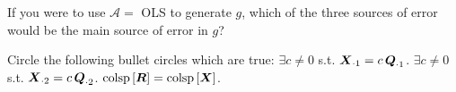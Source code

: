 \documentclass[12pt]{article}
\begin{document}
 If you were to use $\mathcal{A} =$ OLS to generate $g$, which of the three sources of error would be the main source of error in $g$? 


Circle the following bullet circles which are true:
 $\exists c \neq 0$ s.t. $\boldsymbol{X}_{\cdot 1} = c\,\boldsymbol{Q}_{\cdot 1}$. 
 $\exists c \neq 0$ s.t. $\boldsymbol{X}_{\cdot 2} = c\,\boldsymbol{Q}_{\cdot 2}$. 
 $\text{colsp}\left[\boldsymbol{R}\right] =\text{colsp}\left[\boldsymbol{X}\right]$.  
\eenum
\end{document}
